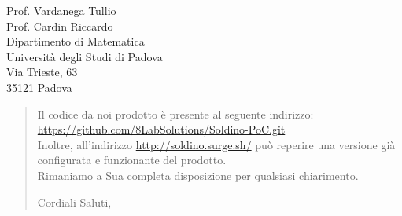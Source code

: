 \begin{letter}{
		Prof. Vardanega Tullio \\
		Prof. Cardin Riccardo \\
		Dipartimento di Matematica \\
		Università degli Studi di Padova \\
		Via Trieste, 63 \\
		35121 Padova}
\begin{quotation}
\noindent Il codice da noi prodotto è presente al seguente indirizzo:\\
\url{https://github.com/8LabSolutions/Soldino-PoC.git}\\
Inoltre, all'indirizzo \url{http://soldino.surge.sh/} 
può reperire una
versione già configurata e funzionante del prodotto.\\
Rimaniamo a Sua completa disposizione per qualsiasi chiarimento.

\vspace{0.5cm}
\noindent Cordiali Saluti,
\closing{}	

\end{quotation}
		
\end{letter}

